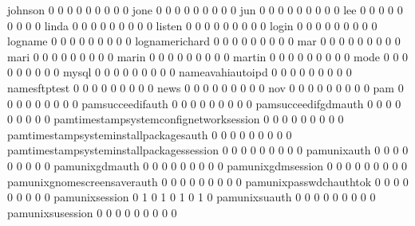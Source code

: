 \documentclass[compress,8pt]{beamer}
\begin{document}
\begin{frame}
\begin{Schunk}
  johnson                                    0   0   0   0   0   0   0   0   0
  jone                                       0   0   0   0   0   0   0   0   0
  jun                                        0   0   0   0   0   0   0   0   0
  lee                                        0   0   0   0   0   0   0   0   0
  linda                                      0   0   0   0   0   0   0   0   0
  listen                                     0   0   0   0   0   0   0   0   0
  login                                      0   0   0   0   0   0   0   0   0
  logname                                    0   0   0   0   0   0   0   0   0
  lognamerichard                             0   0   0   0   0   0   0   0   0
  mar                                        0   0   0   0   0   0   0   0   0
  mari                                       0   0   0   0   0   0   0   0   0
  marin                                      0   0   0   0   0   0   0   0   0
  martin                                     0   0   0   0   0   0   0   0   0
  mode                                       0   0   0   0   0   0   0   0   0
  mysql                                      0   0   0   0   0   0   0   0   0
  nameavahiautoipd                           0   0   0   0   0   0   0   0   0
  namesftptest                               0   0   0   0   0   0   0   0   0
  news                                       0   0   0   0   0   0   0   0   0
  nov                                        0   0   0   0   0   0   0   0   0
  pam                                        0   0   0   0   0   0   0   0   0
  pamsucceedifauth                           0   0   0   0   0   0   0   0   0
  pamsucceedifgdmauth                        0   0   0   0   0   0   0   0   0
  pamtimestampsystemconfignetworksession     0   0   0   0   0   0   0   0   0
  pamtimestampsysteminstallpackagesauth      0   0   0   0   0   0   0   0   0
  pamtimestampsysteminstallpackagessession   0   0   0   0   0   0   0   0   0
  pamunixauth                                0   0   0   0   0   0   0   0   0
  pamunixgdmauth                             0   0   0   0   0   0   0   0   0
  pamunixgdmsession                          0   0   0   0   0   0   0   0   0
  pamunixgnomescreensaverauth                0   0   0   0   0   0   0   0   0
  pamunixpasswdchauthtok                     0   0   0   0   0   0   0   0   0
  pamunixsession                             0   1   0   1   0   1   0   1   0
  pamunixsuauth                              0   0   0   0   0   0   0   0   0
  pamunixsusession                           0   0   0   0   0   0   0   0   0

\end{Schunk}
\end{frame}
\end{document}
